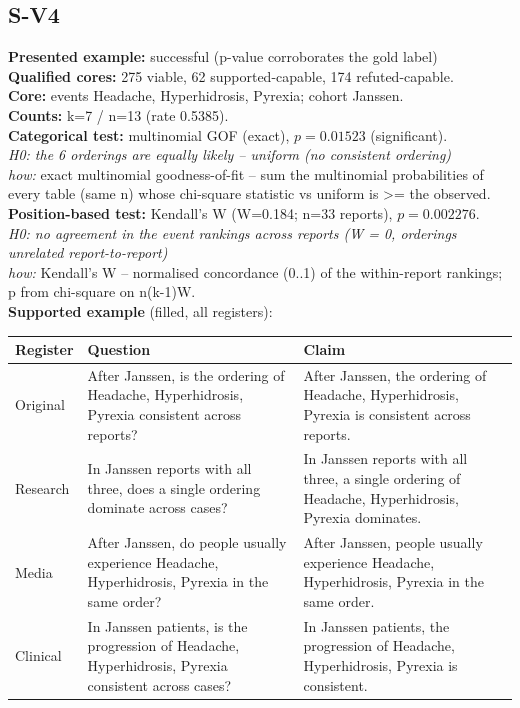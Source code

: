 \documentclass[11pt]{article}
\begin{document}
\subsection*{S-V4}
\textbf{Presented example:} successful (p-value corroborates the gold label) \\
\textbf{Qualified cores:} 275 viable, 62 supported-capable, 174 refuted-capable. \\
\textbf{Core:} events Headache, Hyperhidrosis, Pyrexia; cohort Janssen. \\
\textbf{Counts:} k=7 / n=13  (rate 0.5385). \\
\textbf{Categorical test:} multinomial GOF (exact), $p = 0.01523$ (significant). \\
\emph{H0: the 6 orderings are equally likely -- uniform (no consistent ordering)} \\
\emph{how:} exact multinomial goodness-of-fit -- sum the multinomial probabilities of every table (same n) whose chi-square statistic vs uniform is >= the observed. \\
\textbf{Position-based test:} Kendall's W (W=0.184; n=33 reports), $p = 0.002276$. \\
\emph{H0: no agreement in the event rankings across reports (W = 0, orderings unrelated report-to-report)} \\
\emph{how:} Kendall's W -- normalised concordance (0..1) of the within-report rankings; p from chi-square on n(k-1)W. \\
\textbf{Supported example} (filled, all registers): \\
\begin{tabularx}{\linewidth}{@{}l L L@{}}
\toprule
\textbf{Register} & \textbf{Question} & \textbf{Claim} \\
\midrule
Original & After Janssen, is the ordering of Headache, Hyperhidrosis, Pyrexia consistent across reports? & After Janssen, the ordering of Headache, Hyperhidrosis, Pyrexia is consistent across reports. \\
Research & In Janssen reports with all three, does a single ordering dominate across cases? & In Janssen reports with all three, a single ordering of Headache, Hyperhidrosis, Pyrexia dominates. \\
Media & After Janssen, do people usually experience Headache, Hyperhidrosis, Pyrexia in the same order? & After Janssen, people usually experience Headache, Hyperhidrosis, Pyrexia in the same order. \\
Clinical & In Janssen patients, is the progression of Headache, Hyperhidrosis, Pyrexia consistent across cases? & In Janssen patients, the progression of Headache, Hyperhidrosis, Pyrexia is consistent. \\
\bottomrule
\end{tabularx}
\vspace{3pt}
\end{document}
